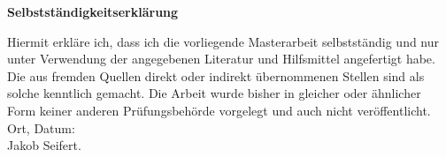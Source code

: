 \begin{center}
    \large
    \textbf{Selbstst\"andigkeitserkl\"arung}
\end{center}
Hiermit erkl\"are ich, dass ich die vorliegende Masterarbeit selbstst\"andig und nur unter Verwendung der angegebenen Literatur und Hilfsmittel angefertigt habe. Die aus fremden Quellen direkt oder indirekt \"ubernommenen Stellen sind als solche kenn\-tlich gemacht.
Die Arbeit wurde bisher in gleicher oder \"ahnlicher Form keiner anderen Pr\"ufungsbeh\"orde
vorgelegt und auch nicht ver\"offentlicht.\\[2cm]
Ort, Datum:\\[1cm]
Jakob Seifert.